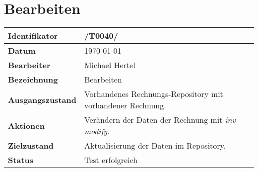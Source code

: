 
\section{Bearbeiten}

\renewcommand{\arraystretch}{1.5}

\begin{center}
 \begin{tabular}{|p{}|p{}|}
	\hline
	\textbf{Identifikator}  & /T0040/ \\
	\hline
	\textbf{Datum} & \today \\
	\hline
	\textbf{Bearbeiter} & Michael Hertel \\
	\hline
	\textbf{Bezeichnung} & Bearbeiten \\
	\hline
	\textbf{Ausgangszustand} & 
		Vorhandenes Rechnungs-Repository mit vorhandener Rechnung. \\
	\hline
	\textbf{Aktionen} & 
		Verändern der Daten der Rechnung mit \textit{inv modify}. \\
	\hline
	\textbf{Zielzustand} & 
		Aktualisierung der Daten im Repository. \\
	\hline
	\textbf{Status} & Test erfolgreich \\
	\hline
 \end{tabular}
\end{center}
